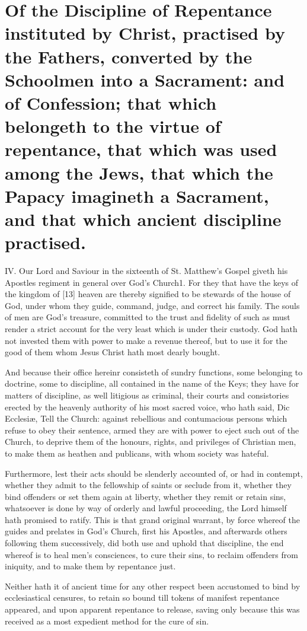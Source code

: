 \section*{Of the Discipline of Repentance instituted by Christ, practised by the Fathers, converted by the Schoolmen into a Sacrament: and of Confession; that which belongeth to the virtue of repentance, that which was used among the Jews, that which the Papacy imagineth a Sacrament, and that which ancient discipline practised.}

IV. Our Lord and Saviour in the sixteenth of St. Matthew’s Gospel giveth his Apostles regiment in general over God’s Church1. For they that have the keys of the kingdom of [13] heaven are thereby signified to be stewards of the house of God, under whom they guide, command, judge, and correct his family. The souls of men are God’s treasure, committed to the trust and fidelity of such as must render a strict account for the very least which is under their custody. God hath not invested them with power to make a revenue thereof, but to use it for the good of them whom Jesus Christ hath most dearly bought.

And because their office hereinr consisteth of sundry functions, some belonging to doctrine, some to discipline, all contained in the name of the Keys; they have for matters of discipline, as well litigious as criminal, their courts and consistories erected by the heavenly authority of his most sacred voice, who hath said, Dic Ecclesiæ, Tell the Church: against rebellious and contumacious persons which refuse to obey their sentence, armed they are with power to eject such out of the Church, to deprive them of the honours, rights, and privileges of Christian men, to make them as heathen and publicans, with whom society was hateful.

Furthermore, lest their acts should be slenderly accounted of, or had in contempt, whether they admit to the fellowship of saints or seclude from it, whether they bind offenders or set them again at liberty, whether they remit or retain sins, whatsoever is done by way of orderly and lawful proceeding, the Lord himself hath promised to ratify. This is that grand original warrant, by force whereof the guides and prelates in God’s Church, first his Apostles, and afterwards others following them successively, did both use and uphold that discipline, the end whereof is to heal men’s consciences, to cure their sins, to reclaim offenders from iniquity, and to make them by repentance just.

Neither hath it of ancient time for any other respect been accustomed to bind by ecclesiastical censures, to retain so bound till tokens of manifest repentance appeared, and upon apparent repentance to release, saving only because this was received as a most expedient method for the cure of sin.

